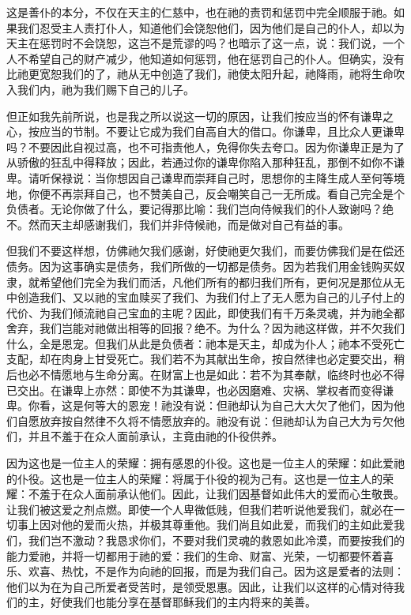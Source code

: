 这是善仆的本分，不仅在天主的仁慈中，也在祂的责罚和惩罚中完全顺服于祂。如果我们忍受主人责打仆人，知道他们会饶恕他们，因为他们是自己的仆人，却以为天主在惩罚时不会饶恕，这岂不是荒谬的吗？也暗示了这一点，说：我们说，一个人不希望自己的财产减少，他知道如何惩罚，他在惩罚自己的仆人。但确实，没有比祂更宽恕我们的了，祂从无中创造了我们，祂使太阳升起，祂降雨，祂将生命吹入我们内，祂为我们赐下自己的儿子。\par

但正如我先前所说，也是我之所以说这一切的原因，让我们按应当的怀有谦卑之心，按应当的节制。不要让它成为我们自高自大的借口。你谦卑，且比众人更谦卑吗？不要因此自视过高，也不可指责他人，免得你失去夸口。因为你谦卑正是为了从骄傲的狂乱中得释放；因此，若通过你的谦卑你陷入那种狂乱，那倒不如你不谦卑。请听保禄说：当你想因自己谦卑而崇拜自己时，思想你的主降生成人至何等境地，你便不再崇拜自己，也不赞美自己，反会嘲笑自己一无所成。看自己完全是个负债者。无论你做了什么，要记得那比喻：我们岂向侍候我们的仆人致谢吗？绝不。然而天主却感谢我们，我们并非侍候祂，而是做对自己有益的事。\par

但我们不要这样想，仿佛祂欠我们感谢，好使祂更欠我们，而要仿佛我们是在偿还债务。因为这事确实是债务，我们所做的一切都是债务。因为若我们用金钱购买奴隶，就希望他们完全为我们而活，凡他们所有的都归我们所有，更何况是那位从无中创造我们、又以祂的宝血赎买了我们、为我们付上了无人愿为自己的儿子付上的代价、为我们倾流祂自己宝血的主呢？因此，即使我们有千万条灵魂，并为祂全都舍弃，我们岂能对祂做出相等的回报？绝不。为什么？因为祂这样做，并不欠我们什么，全是恩宠。但我们从此是负债者：祂本是天主，却成为仆人；祂本不受死亡支配，却在肉身上甘受死亡。我们若不为其献出生命，按自然律也必定要交出，稍后也必不情愿地与生命分离。在财富上也是如此：若不为其奉献，临终时也必不得已交出。在谦卑上亦然：即使不为其谦卑，也必因磨难、灾祸、掌权者而变得谦卑。你看，这是何等大的恩宠！祂没有说：但祂却认为自己大大欠了他们，因为他们自愿放弃按自然律不久将不情愿放弃的。祂没有说：但祂却认为自己大为亏欠他们，并且不羞于在众人面前承认，主竟由祂的仆役供养。\par

因为这也是一位主人的荣耀：拥有感恩的仆役。这也是一位主人的荣耀：如此爱祂的仆役。这也是一位主人的荣耀：将属于仆役的视为己有。这也是一位主人的荣耀：不羞于在众人面前承认他们。因此，让我们因基督如此伟大的爱而心生敬畏。让我们被这爱之剂点燃。即使一个人卑微低贱，但我们若听说他爱我们，就必在一切事上因对他的爱而火热，并极其尊重他。我们尚且如此爱，而我们的主如此爱我们，我们岂不激动？我恳求你们，不要对我们灵魂的救恩如此冷漠，而要按我们的能力爱祂，并将一切都用于祂的爱：我们的生命、财富、光荣，一切都要怀着喜乐、欢喜、热忱，不是作为向祂的回报，而是为我们自己。因为这是爱者的法则：他们以为在为自己所爱者受苦时，是领受恩惠。因此，让我们以这样的心情对待我们的主，好使我们也能分享在基督耶稣我们的主内将来的美善。\par

